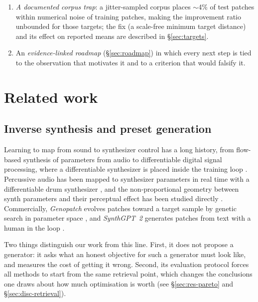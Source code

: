 \documentclass[11pt]{article}
\begin{document}
\begin{enumerate}[label=(\arabic*)]
  the binding constraint, show that the leftover error is spread across the
  objective roughly in proportion to dimensionality (per-dimension shares
  $0.85$--$2.34\times$ uniform, i.e.\ only mildly overweighted in the
  discrete-sensitive blocks), and motivate re-weighting or learning the metric
  rather than a more elaborate search.
\item \emph{A documented corpus trap}: a jitter-sampled corpus places
  $\sim$4\% of test patches within numerical noise of training patches, making
  the improvement ratio unbounded for those targets; the fix (a scale-free
  minimum target distance) and its effect on reported means are described in
  \S\ref{sec:targets}.
\item An \emph{evidence-linked roadmap} (\S\ref{sec:roadmap}) in which every
  next step is tied to the observation that motivates it and to a criterion
  that would falsify it.
\end{enumerate}

\section{Related work}\label{sec:related}

\subsection{Inverse synthesis and preset generation}

Learning to map from sound to synthesizer control has a long history, from
flow-based synthesis of parameters from audio \cite{flow} to differentiable
digital signal processing, where a differentiable synthesizer is placed inside
the training loop \cite{ddsp}. Percussive audio has been mapped to synthesizer
parameters in real time with a differentiable drum synthesizer
\cite{timbreremap}, and the non-proportional geometry between synth parameters
and their perceptual effect has been studied directly \cite{synthmaps}.
Commercially, \emph{Genopatch} evolves patches toward a target sample by genetic
search in parameter space \cite{genopatch}, and \emph{SynthGPT~2} generates
patches from text with a human in the loop \cite{fadr}.

Two things distinguish our work from this line. First, it does not propose a
generator: it asks what an honest objective for such a generator must look like,
and measures the cost of getting it wrong. Second, its evaluation protocol
forces all methods to start from the same retrieval point, which changes the
conclusions one draws about how much optimisation is worth (see
\S\ref{sec:res-pareto} and \S\ref{sec:disc-retrieval}).
\end{document}
